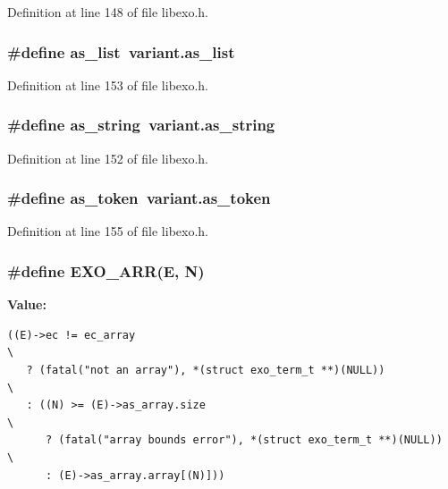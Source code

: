 Definition at line 148 of file libexo.h.
\subsubsection[{as\_\-list}]{\setlength{\rightskip}{0pt plus 5cm}\#define as\_\-list~variant.as\_\-list}\label{libexo_8h_c46f78c0770bda32f1c9e5c2b02b3dbf}




Definition at line 153 of file libexo.h.
\subsubsection[{as\_\-string}]{\setlength{\rightskip}{0pt plus 5cm}\#define as\_\-string~variant.as\_\-string}\label{libexo_8h_5bbf648f4c5bfaf970266ee6bbac7af3}




Definition at line 152 of file libexo.h.
\subsubsection[{as\_\-token}]{\setlength{\rightskip}{0pt plus 5cm}\#define as\_\-token~variant.as\_\-token}\label{libexo_8h_e18966a5a8266a0d4cb452c955e02f47}




Definition at line 155 of file libexo.h.
\subsubsection[{EXO\_\-ARR}]{\setlength{\rightskip}{0pt plus 5cm}\#define EXO\_\-ARR(E, \/  N)}\label{libexo_8h_d9214619301f0ba6fd9cd871b201d4f5}


\textbf{Value:}

\begin{Code}\begin{verbatim}((E)->ec != ec_array                                                    \
   ? (fatal("not an array"), *(struct exo_term_t **)(NULL))             \
   : ((N) >= (E)->as_array.size                                         \
      ? (fatal("array bounds error"), *(struct exo_term_t **)(NULL))    \
      : (E)->as_array.array[(N)]))
\end{verbatim}
\end{Code}


